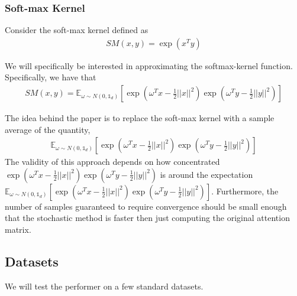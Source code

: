 \documentclass[showpacs,onecolumn,aps,floatfix,superscriptaddress,noshowpacs]{revtex4}
\begin{document}
\subsubsection{Soft-max Kernel}
Consider the soft-max kernel defined as
\begin{align*}
SM(x,y) = \exp( x^{T} y )
\end{align*}

We will specifically be interested in approximating the softmax-kernel function. Specifically, we have that
\begin{align*}
SM(x,y) = \mathbb{E}_{\omega \sim N(0, \mathbb{1}_{d} )}[ \exp( \omega^{T}x - \frac{1}{2}||x||^{2} ) \exp( \omega^{T}y - \frac{1}{2}||y||^{2} )  ]
\end{align*}

The idea behind the paper \cite{Choromanski_2020} is to replace the soft-max kernel with a sample average of the quantity,
\begin{align*}
\mathbb{E}_{\omega \sim N(0, \mathbb{1}_{d} )}[ \exp( \omega^{T}x - \frac{1}{2}||x||^{2} ) \exp( \omega^{T}y - \frac{1}{2}||y||^{2} )  ]
\end{align*}
The validity of this approach depends on how concentrated $\exp( \omega^{T}x - \frac{1}{2}||x||^{2} ) \exp( \omega^{T}y - \frac{1}{2}||y||^{2} ) $ is around the expectation $\mathbb{E}_{\omega \sim N(0, \mathbb{1}_{d} )}[ \exp( \omega^{T}x - \frac{1}{2}||x||^{2} ) \exp( \omega^{T}y - \frac{1}{2}||y||^{2} )  ]$. Furthermore, the number of samples guaranteed to require convergence should be small enough that the stochastic method is faster then just computing the original attention matrix.


\subsection{Datasets}

We will test the performer on a few standard datasets. 


 
 
\end{document}
